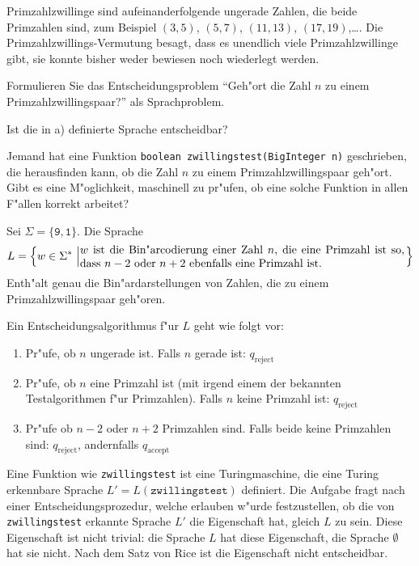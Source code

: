 Primzahlzwillinge sind aufeinanderfolgende ungerade Zahlen, die beide
Primzahlen sind, zum Beispiel $(3,5)$, $(5,7)$, $(11,13)$, $(17,19)$,\dots.
Die Primzahlzwillings-Vermutung besagt, dass es unendlich viele
Primzahlzwillinge gibt, sie konnte bisher weder bewiesen noch wiederlegt
werden.

\begin{teilaufgaben}
\item Formulieren Sie das Entscheidungsproblem ``Geh"ort die Zahl $n$ zu
einem Primzahlzwillingspaar?'' als Sprachproblem.
\item Ist die in a) definierte Sprache entscheidbar?
\item Jemand hat eine Funktion \texttt{boolean zwillingstest(BigInteger n)}
geschrieben, die herausfinden kann, ob die Zahl $n$ zu einem
Primzahlzwillingspaar geh"ort.
Gibt es eine M"oglichkeit, maschinell zu pr"ufen, ob eine solche Funktion
in allen F"allen korrekt arbeitet?
\end{teilaufgaben}

\begin{loesung}
\begin{teilaufgaben}
\item Sei $\Sigma=\{\texttt{9},\texttt{1}\}$. Die Sprache
\[
L=\left\{w\in\Sigma^*\,\left|
\begin{minipage}{4truein}
$w$ ist die Bin"arcodierung einer Zahl $n$, die eine Primzahl ist
so, dass $n-2$ oder $n+2$ ebenfalls eine Primzahl ist.
\end{minipage}
\right.
\right\}
\]
Enth"alt genau die Bin"ardarstellungen von Zahlen, die zu einem
Primzahlzwillingspaar geh"oren.
\item
Ein Entscheidungsalgorithmus f"ur $L$ geht wie folgt vor:
\begin{enumerate}
\item Pr"ufe, ob $n$ ungerade ist. Falls $n$ gerade ist: $q_\text{reject}$
\item Pr"ufe, ob $n$ eine Primzahl ist (mit irgend einem der bekannten
Testalgorithmen f"ur Primzahlen). Falls $n$ keine Primzahl ist:
$q_{\text{reject}}$
\item Pr"ufe ob $n-2$ oder $n+2$ Primzahlen sind. Falls beide keine
Primzahlen sind: $q_{\text{reject}}$, andernfalls $q_{\text{accept}}$
\end{enumerate}
\item
Eine Funktion wie \texttt{zwillingstest} ist eine Turingmaschine, die
eine Turing erkennbare Sprache $L'=L(\texttt{zwillingstest})$ definiert.
Die Aufgabe fragt nach einer Entscheidungsprozedur, welche erlauben
w"urde festzustellen, ob die von \texttt{zwillingstest} erkannte
Sprache $L'$ die Eigenschaft hat, gleich $L$ zu sein. Diese
Eigenschaft ist nicht trivial: die Sprache $L$ hat diese Eigenschaft,
die Sprache $\emptyset$ hat sie nicht. Nach dem Satz von Rice ist
die Eigenschaft nicht entscheidbar.
\qedhere
\end{teilaufgaben}
\end{loesung}

